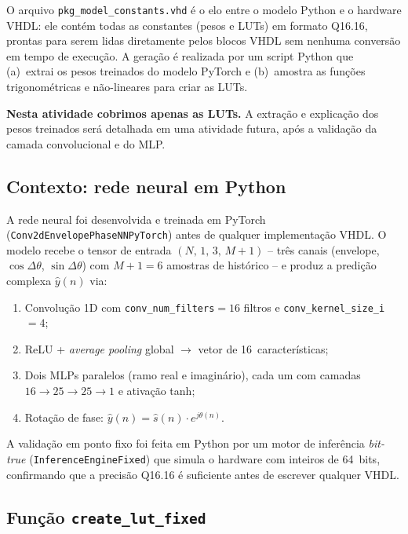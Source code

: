 \documentclass[a4paper,12pt]{article}
\begin{document}
O arquivo \texttt{pkg\_model\_constants.vhd} \'e o elo entre o modelo Python e o hardware VHDL:
ele cont\'em todas as constantes (pesos e LUTs) em formato Q16.16, prontas para serem lidas
diretamente pelos blocos VHDL sem nenhuma convers\~ao em tempo de execu\c{c}\~ao.
A gera\c{c}\~ao \'e realizada por um script Python que (a)~extrai os pesos treinados do modelo
PyTorch e (b)~amostra as fun\c{c}\~oes trigonom\'etricas e n\~ao-lineares para criar as LUTs.

\textbf{Nesta atividade cobrimos apenas as LUTs.} A extra\c{c}\~ao e explica\c{c}\~ao dos pesos
treinados ser\'a detalhada em uma atividade futura, ap\'os a valida\c{c}\~ao da camada
convolucional e do MLP.

\subsection{Contexto: rede neural em Python}

A rede neural foi desenvolvida e treinada em PyTorch (\texttt{Conv2dEnvelopePhaseNNPyTorch})
antes de qualquer implementa\c{c}\~ao VHDL. O modelo recebe o tensor de entrada
$(N,\,1,\,3,\,M\!+\!1)$ -- tr\^es canais (envelope, $\cos\Delta\theta$, $\sin\Delta\theta$)
com $M+1 = 6$ amostras de hist\'orico -- e produz a predi\c{c}\~ao complexa $\hat{y}(n)$ via:
\begin{enumerate}
    \item Convolução 1D com \texttt{conv\_num\_filters}$=16$ filtros e
          \texttt{conv\_kernel\_size\_i}$=4$;
    \item ReLU + \textit{average pooling} global $\to$ vetor de 16~caracter\'isticas;
    \item Dois MLPs paralelos (ramo real e imagin\'ario), cada um com camadas
          $16 \to 25 \to 25 \to 1$ e ativa\c{c}\~ao tanh;
    \item Rota\c{c}\~ao de fase: $\hat{y}(n) = \hat{s}(n)\cdot e^{j\theta(n)}$.
\end{enumerate}

A valida\c{c}\~ao em ponto fixo foi feita em Python por um motor de infer\^encia
\textit{bit-true} (\texttt{InferenceEngineFixed}) que simula o hardware com inteiros de 64~bits,
confirmando que a precis\~ao Q16.16 \'e suficiente antes de escrever qualquer VHDL.

\subsection{Fun\c{c}\~ao \texttt{create\_lut\_fixed}}
\end{document}
